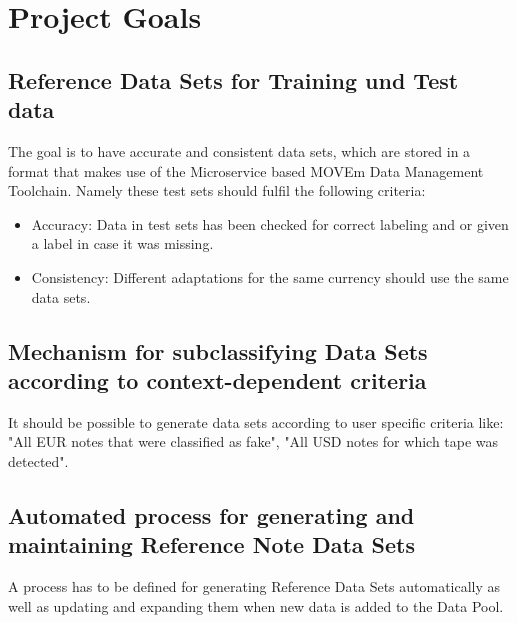 \chapter{Project Goals}
\label{chap:projectgoals}

\section{Reference Data Sets for Training und Test data}
\label{sec:refdata_sets}

The goal is to have accurate and consistent data sets, which are stored in a format that makes use of the Microservice based MOVEm Data Management Toolchain. Namely these test sets should fulfil the following criteria:

\begin{itemize}
\item Accuracy: Data in test sets has been checked for correct labeling and or given a label in case it was missing.
\item Consistency: Different adaptations for the same currency should use the same data sets. 
\end{itemize}
\section{Mechanism for subclassifying Data Sets according to context-dependent criteria }
\label{sec:custom datasets}
It should be possible to generate data sets according to user specific criteria like: "All EUR notes that were classified as fake", "All USD notes for which tape was detected".
\section{Automated process for generating and maintaining Reference Note Data Sets}
\label{sec:automated_process}
A process has to be defined for generating Reference Data Sets automatically as well as updating and expanding them when new data is added to the Data Pool.



